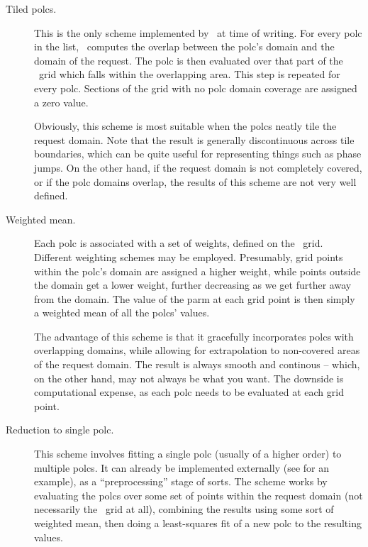   \begin{description}

  \item[Tiled polcs.] This is the only scheme implemented by \Parm\ at time of
  writing. For every polc in the list, \Parm\ computes the overlap between
  the polc's domain and the domain of the request. The polc is then evaluated
  over that part of the \Cells\ grid which falls within the overlapping area.
  This step is repeated for every polc. Sections of the grid with no polc
  domain coverage are assigned a zero value.

  Obviously, this scheme is most suitable when the polcs neatly tile
  the request domain. Note that the result is generally discontinuous across
  tile boundaries, which can be quite useful for representing things such as
  phase jumps. On the other  hand, if the request domain is not completely
  covered, or if the polc domains overlap, the results of this scheme are not
  very well defined. 

  \item[Weighted mean.] Each polc is associated with a set of weights, defined
  on the \Cells\ grid. Different weighting schemes may be employed. Presumably,
  grid points within the polc's domain are assigned a higher weight, while
  points outside the domain get a lower weight, further decreasing as we get
  further away from the domain. The value of the parm at each grid point is
  then simply a weighted mean of all the polcs' values.

  The advantage of this scheme is that it gracefully incorporates polcs with
  overlapping domains, while allowing for extrapolation to non-covered areas of
  the request domain. The result is always smooth and continous -- which, on the
  other hand, may not always be what you want. The downside is computational
  expense, as each polc needs to be evaluated at each grid point.

  \item[Reduction to single polc.] This scheme involves fitting a single polc
  (usually of a higher order) to multiple polcs. It can already be implemented
  externally (see  for an example), as a ``preprocessing''
  stage of sorts. The scheme works by evaluating the polcs over some set of
  points within the request domain (not necessarily the \Cells\ grid at all),
  combining the results using some sort of weighted mean, then doing a
  least-squares fit of a new polc to the resulting values.

  \end{description}

